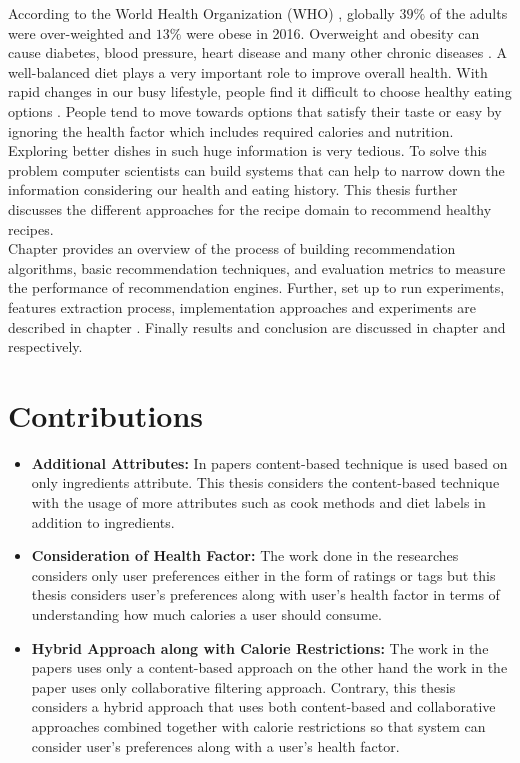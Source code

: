 According to the World Health Organization (WHO) \cite{42}, globally $39\%$ of the adults were over-weighted and $13\%$ were obese in 2016. Overweight and obesity can cause diabetes, blood pressure, heart disease and many other chronic diseases \cite{43}. A well-balanced diet plays a very important role to improve overall health. With rapid changes in our busy lifestyle, people find it difficult to choose healthy eating options \cite{13}. People tend to move towards options that satisfy their taste or easy by ignoring the health factor which includes required calories and nutrition. Exploring better dishes in such huge information is very tedious. To solve this problem computer scientists can build systems that can help to narrow down the information considering our health and eating history. This thesis further discusses the different approaches for the recipe domain to recommend healthy recipes.
\\
Chapter  provides an overview of the process of building recommendation algorithms, basic recommendation techniques, and evaluation metrics to measure the performance of recommendation engines. Further, set up to run experiments, features extraction process, implementation approaches and experiments are described in chapter . Finally results and conclusion are discussed in chapter  and  respectively.

\section{Contributions}
\begin{itemize}
\item \textbf{Additional Attributes:} In papers \cite{13,15} content-based technique is used based on only ingredients attribute. This thesis considers the content-based technique with the usage of more attributes such as cook methods and diet labels in addition to ingredients.
\item \textbf{Consideration of Health Factor:} The work done in the researches \cite{13,15,16} considers only user preferences either in the form of ratings or tags but this thesis considers user's preferences along with user's health factor in terms of understanding how much calories a user should consume.
\item \textbf{Hybrid Approach along with Calorie Restrictions:} The work in the papers \cite{13,15} uses only a content-based approach on the other hand the work in the paper \cite{16} uses only collaborative filtering approach. Contrary, this thesis considers a hybrid approach that uses both content-based and collaborative approaches combined together with calorie restrictions so that system can consider user's preferences along with a user's health factor.
\end{itemize}
\pagebreak


